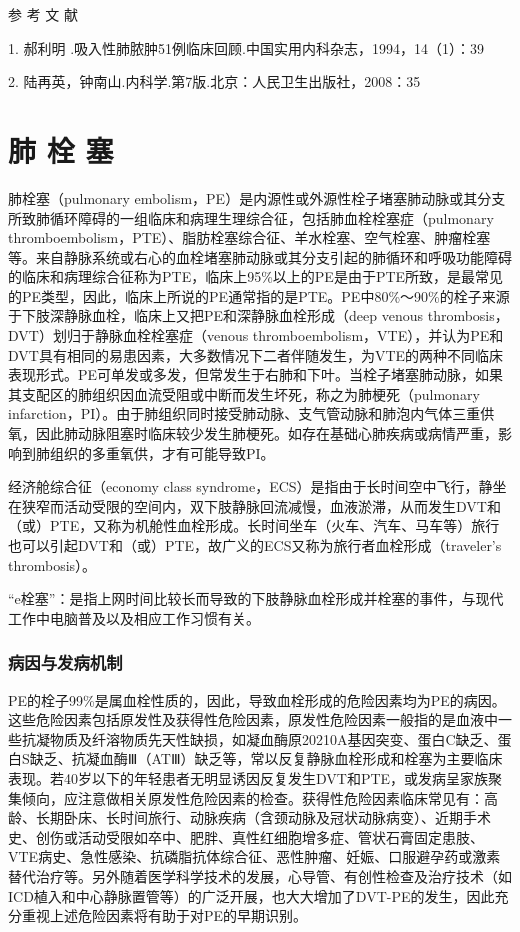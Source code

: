 \protect\hypertarget{text00277.html}{}{}

\hypertarget{text00277.htmlux5cux23CHP9-7-4}{}
参 考 文 献

1. 郝利明 .吸入性肺脓肿51例临床回顾.中国实用内科杂志，1994，14（1）：39

2. 陆再英，钟南山.内科学.第7版.北京：人民卫生出版社，2008：35

\protect\hypertarget{text00278.html}{}{}

\chapter{肺 栓 塞}

肺栓塞（pulmonary
embolism，PE）是内源性或外源性栓子堵塞肺动脉或其分支所致肺循环障碍的一组临床和病理生理综合征，包括肺血栓栓塞症（pulmonary
thromboembolism，PTE）、脂肪栓塞综合征、羊水栓塞、空气栓塞、肿瘤栓塞等。来自静脉系统或右心的血栓堵塞肺动脉或其分支引起的肺循环和呼吸功能障碍的临床和病理综合征称为PTE，临床上95\%以上的PE是由于PTE所致，是最常见的PE类型，因此，临床上所说的PE通常指的是PTE。PE中80\%～90\%的栓子来源于下肢深静脉血栓，临床上又把PE和深静脉血栓形成（deep
venous thrombosis，DVT）划归于静脉血栓栓塞症（venous
thromboembolism，VTE），并认为PE和DVT具有相同的易患因素，大多数情况下二者伴随发生，为VTE的两种不同临床表现形式。PE可单发或多发，但常发生于右肺和下叶。当栓子堵塞肺动脉，如果其支配区的肺组织因血流受阻或中断而发生坏死，称之为肺梗死（pulmonary
infarction，PI）。由于肺组织同时接受肺动脉、支气管动脉和肺泡内气体三重供氧，因此肺动脉阻塞时临床较少发生肺梗死。如存在基础心肺疾病或病情严重，影响到肺组织的多重氧供，才有可能导致PI。

经济舱综合征（economy class
syndrome，ECS）是指由于长时间空中飞行，静坐在狭窄而活动受限的空间内，双下肢静脉回流减慢，血液淤滞，从而发生DVT和（或）PTE，又称为机舱性血栓形成。长时间坐车（火车、汽车、马车等）旅行也可以引起DVT和（或）PTE，故广义的ECS又称为旅行者血栓形成（traveler's
thrombosis）。

“e栓塞”：是指上网时间比较长而导致的下肢静脉血栓形成并栓塞的事件，与现代工作中电脑普及以及相应工作习惯有关。

\subsection{病因与发病机制}

PE的栓子99\%是属血栓性质的，因此，导致血栓形成的危险因素均为PE的病因。这些危险因素包括原发性及获得性危险因素，原发性危险因素一般指的是血液中一些抗凝物质及纤溶物质先天性缺损，如凝血酶原20210A基因突变、蛋白C缺乏、蛋白S缺乏、抗凝血酶Ⅲ（ATⅢ）缺乏等，常以反复静脉血栓形成和栓塞为主要临床表现。若40岁以下的年轻患者无明显诱因反复发生DVT和PTE，或发病呈家族聚集倾向，应注意做相关原发性危险因素的检查。获得性危险因素临床常见有：高龄、长期卧床、长时间旅行、动脉疾病（含颈动脉及冠状动脉病变）、近期手术史、创伤或活动受限如卒中、肥胖、真性红细胞增多症、管状石膏固定患肢、VTE病史、急性感染、抗磷脂抗体综合征、恶性肿瘤、妊娠、口服避孕药或激素替代治疗等。另外随着医学科学技术的发展，心导管、有创性检查及治疗技术（如ICD植入和中心静脉置管等）的广泛开展，也大大增加了DVT-PE的发生，因此充分重视上述危险因素将有助于对PE的早期识别。

